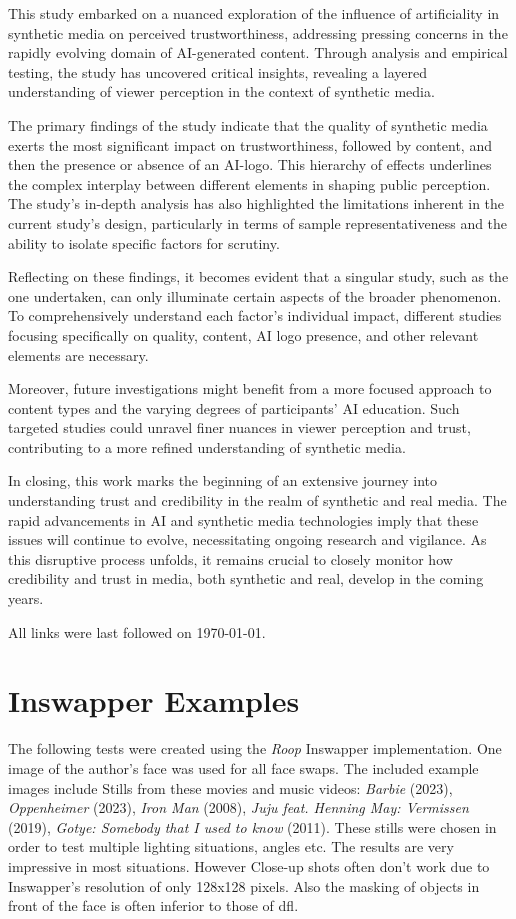 \documentclass[
  a4paper,  %
  twoside,  %
  bibliography=totoc,
  headsepline,
  cleardoublepage=empty,
  parskip=half,
  draft=false
]{scrbook}
\begin{document}
This study embarked on a nuanced exploration of the influence of artificiality in synthetic media on perceived trustworthiness, addressing pressing concerns in the rapidly evolving domain of AI-generated content. Through analysis and empirical testing, the study has uncovered critical insights, revealing a layered understanding of viewer perception in the context of synthetic media.

The primary findings of the study indicate that the quality of synthetic media exerts the most significant impact on trustworthiness, followed by content, and then the presence or absence of an AI-logo. This hierarchy of effects underlines the complex interplay between different elements in shaping public perception. The study's in-depth analysis has also highlighted the limitations inherent in the current study's design, particularly in terms of sample representativeness and the ability to isolate specific factors for scrutiny.

Reflecting on these findings, it becomes evident that a singular study, such as the one undertaken, can only illuminate certain aspects of the broader phenomenon. To comprehensively understand each factor's individual impact, different studies focusing specifically on quality, content, AI logo presence, and other relevant elements are necessary.

Moreover, future investigations might benefit from a more focused approach to content types and the varying degrees of participants' AI education. Such targeted studies could unravel finer nuances in viewer perception and trust, contributing to a more refined understanding of synthetic media.

In closing, this work marks the beginning of an extensive journey into understanding trust and credibility in the realm of synthetic and real media. The rapid advancements in AI and synthetic media technologies imply that these issues will continue to evolve, necessitating ongoing research and vigilance. As this disruptive process unfolds, it remains crucial to closely monitor how credibility and trust in media, both synthetic and real, develop in the coming years.


\printbibliography
All links were last followed on \today{}.

\appendix
\chapter{Inswapper Examples}
\label{chap:insightface-demos}
The following tests were created using the \textit{Roop} Inswapper implementation. One image of the author's face was used for all face swaps. The included example images include Stills from these movies and music videos: \textit{Barbie} (2023), \textit{Oppenheimer} (2023), \textit{Iron Man} (2008), \textit{Juju feat. Henning May: Vermissen} (2019), \textit{Gotye: Somebody that I used to know} (2011).
These stills were chosen in order to test multiple lighting situations, angles etc. The results are very impressive in most situations. However Close-up shots often don't work due to Inswapper's resolution of only 128x128 pixels. Also the masking of objects in front of the face is often inferior to those of \gls{dfl}.
\end{document}

